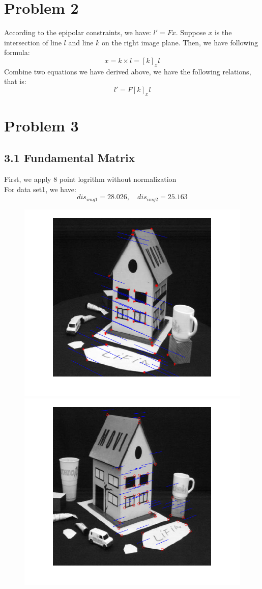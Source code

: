 \documentclass[letterpaper]{article}
\begin{document}
\section*{Problem 2}
According to the epipolar constraints, we have: $l' = Fx$.
Suppose $x$ is the intersection of line $l$ and line $k$ on the right image plane. Then, we have following formula:
$$x = k \times l = [k]_xl$$
Combine two equations we have derived above, we have the following relations, that is:
$$l' = F[k]_xl$$

\section*{Problem 3}
\subsection*{3.1 Fundamental Matrix}
First, we apply 8 point logrithm without normalization\\
For data set1, we have:
$$dis_{img1} = 28.026,\quad dis_{img2} = 25.163$$
\begin{figure}[H]
	\centering
	\includegraphics[scale=0.4]{wo1.png}\includegraphics[scale=0.4]{wo2.png}
\end{figure}
\end{document}
